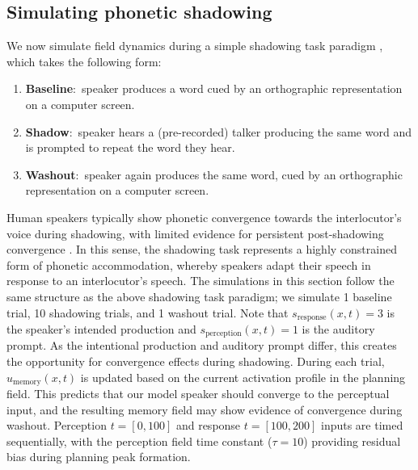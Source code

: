 \documentclass[cameraready]{Interspeech}
\begin{document}
 
\subsection{Simulating phonetic shadowing}

We now simulate field dynamics during a simple shadowing task paradigm \cite{goldinger1998}, which takes the following form:

\begin{enumerate}
    \item \textbf{Baseline}:~speaker produces a word cued by an orthographic representation on a computer screen.
    \item \textbf{Shadow}:~speaker hears a (pre-recorded) talker producing the same word and is prompted to repeat the word they hear.
    \item \textbf{Washout}:~speaker again produces the same word, cued by an orthographic representation on a computer screen.
\end{enumerate}

Human speakers typically show phonetic convergence towards the interlocutor's voice during shadowing, with limited evidence for persistent post-shadowing convergence \cite{goldinger1998, babel2012}. In this sense, the shadowing task represents a highly constrained form of phonetic accommodation, whereby speakers adapt their speech in response to an interlocutor's speech. The simulations in this section follow the same structure as the above shadowing task paradigm; we simulate 1 baseline trial, 10 shadowing trials, and 1 washout trial. Note that $s_{\text{response}}(x,t) = 3$ is the speaker's intended production and $s_{\text{perception}}(x,t) = 1$ is the auditory prompt. As the intentional production and auditory prompt differ, this creates the opportunity for convergence effects during shadowing. During each trial, $u_{\text{memory}}(x,t)$ is updated based on the current activation profile in the planning field. This predicts that our model speaker should converge to the perceptual input, and the resulting memory field may show evidence of convergence during washout. Perception $t = [0,100]$ and response $t = [100, 200]$ inputs are timed sequentially, with the perception field time constant ($\tau = 10$) providing residual bias during planning peak formation. 
\end{document}
